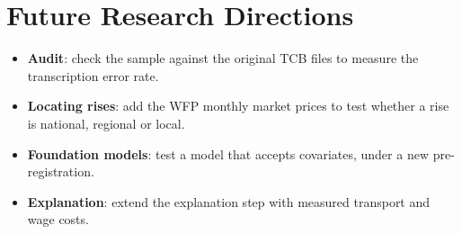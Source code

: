 \documentclass[12pt]{report}
\begin{document}
\section{Future Research Directions}
\begin{itemize}
    \item \textbf{Audit}: check the sample against the original TCB files to measure the transcription error rate.
    \item \textbf{Locating rises}: add the WFP monthly market prices to test whether a rise is national, regional or local.
    \item \textbf{Foundation models}: test a model that accepts covariates, under a new pre-registration.
    \item \textbf{Explanation}: extend the explanation step with measured transport and wage costs.
\end{itemize}

\begingroup
\let\clearpage\relax
\renewcommand{\bibname}{References}
\printbibliography
\endgroup
\end{document}
